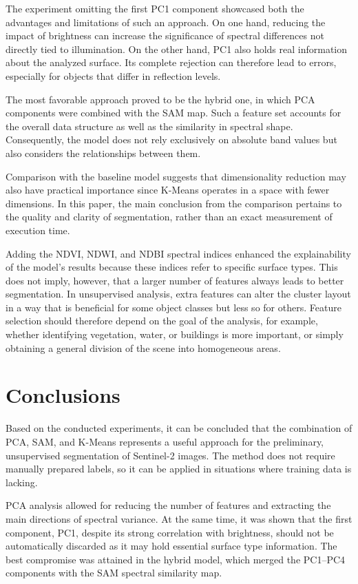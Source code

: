 \documentclass[12pt,a4paper]{article}
\begin{document}
    The experiment omitting the first PC1 component showcased both the advantages and limitations of such an approach. On one hand, reducing the impact of brightness can increase the significance of spectral differences not directly tied to illumination. On the other hand, PC1 also holds real information about the analyzed surface. Its complete rejection can therefore lead to errors, especially for objects that differ in reflection levels.

    The most favorable approach proved to be the hybrid one, in which PCA components were combined with the SAM map. Such a feature set accounts for the overall data structure as well as the similarity in spectral shape. Consequently, the model does not rely exclusively on absolute band values but also considers the relationships between them.

    Comparison with the baseline model suggests that dimensionality reduction may also have practical importance since K-Means operates in a space with fewer dimensions. In this paper, the main conclusion from the comparison pertains to the quality and clarity of segmentation, rather than an exact measurement of execution time.

    Adding the NDVI, NDWI, and NDBI spectral indices enhanced the explainability of the model's results because these indices refer to specific surface types. This does not imply, however, that a larger number of features always leads to better segmentation. In unsupervised analysis, extra features can alter the cluster layout in a way that is beneficial for some object classes but less so for others. Feature selection should therefore depend on the goal of the analysis, for example, whether identifying vegetation, water, or buildings is more important, or simply obtaining a general division of the scene into homogeneous areas.

    \section{Conclusions}
\label{sec:wnioski}

    Based on the conducted experiments, it can be concluded that the combination of PCA, SAM, and K-Means represents a useful approach for the preliminary, unsupervised segmentation of Sentinel-2 images. The method does not require manually prepared labels, so it can be applied in situations where training data is lacking.

    PCA analysis allowed for reducing the number of features and extracting the main directions of spectral variance. At the same time, it was shown that the first component, PC1, despite its strong correlation with brightness, should not be automatically discarded as it may hold essential surface type information. The best compromise was attained in the hybrid model, which merged the PC1--PC4 components with the SAM spectral similarity map.
\end{document}
